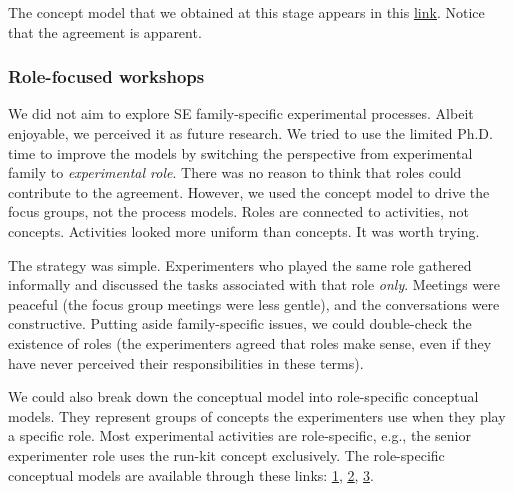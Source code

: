 The concept model that we obtained at this stage appears in this \href{https://zenodo.org/record/7102405#.YyuAfOzMLUI}{\ul{link}}. Notice that the agreement is apparent. 

\subsubsection{Role-focused workshops}\label{subsubsec-focus-groups-role}
We did not aim to explore SE family-specific experimental processes. Albeit enjoyable, we perceived it as future research. We tried to use the limited Ph.D. time to improve the models by switching the perspective from experimental family to \textit{experimental role}. There was no reason to think that roles could contribute to the agreement. However, we used the concept model to drive the focus groups, not the process models. Roles are connected to activities, not concepts. Activities looked more uniform than concepts. It was worth trying.

The strategy was simple. Experimenters who played the same role gathered informally and discussed the tasks associated with that role \textit{only}. Meetings were peaceful (the focus group meetings were less gentle), and the conversations were constructive. Putting aside family-specific issues, we could double-check the existence of roles (the experimenters agreed that roles make sense, even if they have never perceived their responsibilities in these terms). 

We could also break down the conceptual model into role-specific conceptual models. They represent groups of concepts the experimenters use when they play a specific role. Most experimental activities are role-specific, e.g., the senior experimenter role uses the run-kit concept exclusively. The role-specific conceptual models are available through these links: \href{https://zenodo.org/record/7102431#.YyuFvuzMLUI}{\ul{1}}, \href{https://zenodo.org/record/7102450#.YyuG2OzMLUI}{\ul{2}}, \href{https://zenodo.org/record/7102464#.YyuIkOzMLUI}{\ul{3}}.